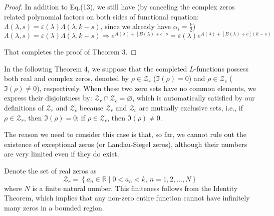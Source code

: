 \documentclass[12pt]{article}
\begin{document}
\begin{proof}
In addition to Eq.(13), we still have (by canceling the complex zeros related polynomial factors on both sides of functional equation: $\Lambda(\lambda, s)=\varepsilon(\lambda)\Lambda(\lambda, k-s)$, since we already have $\alpha_i=\frac{k}{2}$)
\begin{equation}\Lambda(\lambda, s)=\varepsilon(\lambda)\Lambda(\lambda, k-s)\Longrightarrow e^{A(\lambda)+[B(\lambda)+c]s} =\varepsilon(\lambda)e^{A(\lambda)+[B(\lambda)+c](k-s)}\end{equation}

That completes the proof of Theorem 3.

\end{proof}

In the following Theorem 4, we suppose that the completed $L$-functions possess  both real and complex zeros, denoted by $\rho \in \mathcal{Z}_{r}$ ($\Im(\rho)=0$) and $\rho \in \mathcal{Z}_{c}$ ($\Im(\rho)\neq 0$), respectively. When these two zero sets have no common elements, we express their disjointness by: $\mathcal{Z}_{r} \cap \mathcal{Z}_{c} = \varnothing$, which is automatically satisfied by our definitions of $\mathcal{Z}_{r}$  and $\mathcal{Z}_{c}$ because $\mathcal{Z}_{r}$ and $\mathcal{Z}_{c}$ are mutually exclusive sets, i.e., if $\rho \in \mathcal{Z}_{r}$, then $\Im(\rho)=0$; if $\rho \in \mathcal{Z}_{c}$, then $\Im(\rho)\neq 0$.

The reason we need to consider this case is that, so far, we cannot rule out the existence of exceptional zeros (or Landau-Siegel zeros), although their numbers are very limited even if they do exist.

Denote the set of real zeros as
\begin{equation}
\mathcal{Z}_{r} = \left\{ a_n \in \mathbb{R} \mid 0 < a_n < k, \, n=1,2,\ldots,N \right\}
\end{equation}
where $ N $ is a finite natural number. This finiteness follows from the Identity Theorem, which implies that any non-zero entire function cannot have infinitely many zeros in a bounded region.
\end{document}
